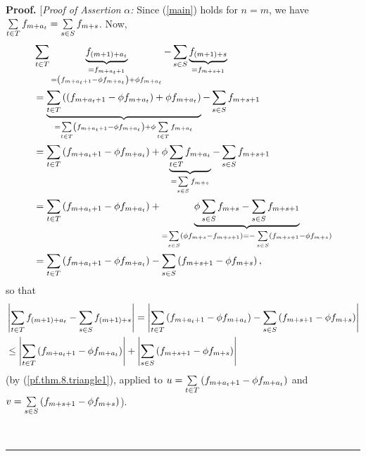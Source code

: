 \documentclass[numbers=enddot,12pt,final,onecolumn,notitlepage]{scrartcl}%
\numberwithin{exer}{section}
\theoremstyle{definition}
\newenvironment{proof}[1][Proof]{\noindent\textbf{#1.} }{\ \rule{0.5em}{0.5em}}
\let\sumnonlimits\sum
\renewcommand{\sum}{\sumnonlimits\limits}
\begin{document}
\begin{proof}
[\textit{Proof of Assertion }$\alpha$\textit{:} Since (\ref{main}) holds for
$n=m$, we have $\sum\limits_{t\in T}f_{m+a_{t}}=\sum\limits_{s\in S}f_{m+s}$.
Now,%
\begin{align*}
&  \sum\limits_{t\in T}\underbrace{f_{\left(  m+1\right)  +a_{t}}%
}_{\substack{=f_{m+a_{t}+1}\\=\left(  f_{m+a_{t}+1}-\phi f_{m+a_{t}}\right)
+\phi f_{m+a_{t}}}}-\sum\limits_{s\in S}\underbrace{f_{\left(  m+1\right)
+s}}_{=f_{m+s+1}}\\
&  =\underbrace{\sum\limits_{t\in T}\left(  \left(  f_{m+a_{t}+1}-\phi
f_{m+a_{t}}\right)  +\phi f_{m+a_{t}}\right)  }_{=\sum\limits_{t\in T}\left(
f_{m+a_{t}+1}-\phi f_{m+a_{t}}\right)  +\phi\sum\limits_{t\in T}f_{m+a_{t}}%
}-\sum\limits_{s\in S}f_{m+s+1}\\
&  =\sum\limits_{t\in T}\left(  f_{m+a_{t}+1}-\phi f_{m+a_{t}}\right)
+\phi\underbrace{\sum\limits_{t\in T}f_{m+a_{t}}}_{=\sum\limits_{s\in
S}f_{m+s}}-\sum\limits_{s\in S}f_{m+s+1}\\
&  =\sum\limits_{t\in T}\left(  f_{m+a_{t}+1}-\phi f_{m+a_{t}}\right)
+\underbrace{\phi\sum\limits_{s\in S}f_{m+s}-\sum\limits_{s\in S}f_{m+s+1}%
}_{=\sum\limits_{s\in S}\left(  \phi f_{m+s}-f_{m+s+1}\right)  =-\sum
\limits_{s\in S}\left(  f_{m+s+1}-\phi f_{m+s}\right)  }\\
&  =\sum\limits_{t\in T}\left(  f_{m+a_{t}+1}-\phi f_{m+a_{t}}\right)
-\sum\limits_{s\in S}\left(  f_{m+s+1}-\phi f_{m+s}\right)  ,
\end{align*}
so that%
\begin{align}
&  \left\vert \sum\limits_{t\in T}f_{\left(  m+1\right)  +a_{t}}%
-\sum\limits_{s\in S}f_{\left(  m+1\right)  +s}\right\vert =\left\vert
\sum\limits_{t\in T}\left(  f_{m+a_{t}+1}-\phi f_{m+a_{t}}\right)
-\sum\limits_{s\in S}\left(  f_{m+s+1}-\phi f_{m+s}\right)  \right\vert
\nonumber\\
&  \leq\left\vert \sum\limits_{t\in T}\left(  f_{m+a_{t}+1}-\phi f_{m+a_{t}%
}\right)  \right\vert +\left\vert \sum\limits_{s\in S}\left(  f_{m+s+1}-\phi
f_{m+s}\right)  \right\vert \label{Estimate1}%
\end{align}
(by (\ref{pf.thm.8.triangle1}), applied to $u=\sum\limits_{t\in T}\left(
f_{m+a_{t}+1}-\phi f_{m+a_{t}}\right)  $ and $v=\sum\limits_{s\in S}\left(
f_{m+s+1}-\phi f_{m+s}\right)  $).


\end{proof}
\end{document}
